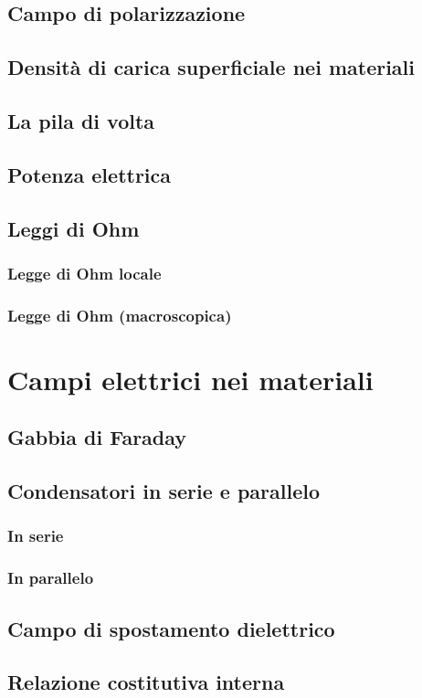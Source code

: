 \documentclass{book}
\begin{document}
\section{Campo di polarizzazione}
\section{Densit\`a di carica superficiale nei materiali}
\section{La pila di volta}
\section{Potenza elettrica}
\section{Leggi di Ohm}
\subsection{Legge di Ohm locale}
\subsection{Legge di Ohm (macroscopica)}

\chapter{Campi elettrici nei materiali}
\section{Gabbia di Faraday}
\section{Condensatori in serie e parallelo}
\subsection{In serie}
\subsection{In parallelo}
\section{Campo di spostamento dielettrico}
\section{Relazione costitutiva interna}
\end{document}
